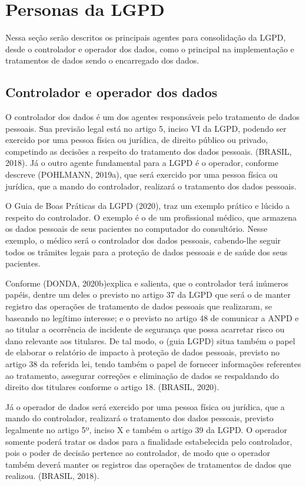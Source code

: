 \documentclass[
	12pt,				%
	openright,			%
	oneside,			%
	a4paper,			%
	english,			%
	french,				%
	spanish,			%
	brazil,				%
	]{abntex2}
\begin{document}
\section{Personas da LGPD}
\label{sec: exemplo2}

Nessa seção serão descritos os principais agentes para consolidação da LGPD, desde o controlador e operador dos dados, como o principal na implementação e tratamentos de dados sendo o encarregado dos dados.

\subsection{Controlador e operador dos dados}

O controlador dos dados é um dos agentes responsáveis pelo tratamento de dados pessoais. Sua previsão legal está no artigo 5, inciso VI da LGPD, podendo ser exercido por uma pessoa física ou jurídica, de direito público ou privado, competindo as decisões a respeito do tratamento dos dados pessoais. (BRASIL, 2018). Já o outro agente fundamental para a LGPD é o operador, conforme descreve (POHLMANN, 2019a), que será exercido por uma pessoa física ou jurídica, que a mando do controlador, realizará o tratamento dos dados pessoais.

O Guia de Boas Práticas da LGPD (2020), traz um exemplo prático e lúcido a respeito do controlador. O exemplo é o de um profissional médico, que armazena os dados pessoais de seus pacientes no computador do consultório. Nesse exemplo, o médico será o controlador dos dados pessoais, cabendo-lhe seguir todos os trâmites legais para a proteção de dados pessoais e de saúde dos seus pacientes.

Conforme (DONDA, 2020b)explica e salienta, que o controlador terá inúmeros papéis, dentre um deles o previsto no artigo 37 da LGPD que será o de manter registro das operações de tratamento de dados pessoais que realizaram, se baseando no legítimo interesse; e o previsto no artigo 48 de comunicar a ANPD e ao titular a ocorrência de incidente de segurança que possa acarretar risco ou dano relevante aos titulares. De tal modo, o (guia LGPD) situa também o papel de elaborar o relatório de impacto à proteção de dados pessoais, previsto no artigo 38 da referida lei, tendo também o papel de fornecer informações referentes ao tratamento, assegurar correções e eliminação de dados se respaldando do direito dos titulares conforme o artigo 18. (BRASIL, 2020).

Já o operador de dados será exercido por uma pessoa física ou jurídica, que a mando do controlador, realizará o tratamento dos dados pessoais, previsto legalmente no artigo 5º, inciso X e também o artigo 39 da LGPD. O operador somente poderá tratar os dados para a finalidade estabelecida pelo controlador, pois o poder de decisão pertence ao controlador, de modo que o operador também deverá manter os registros das operações de tratamentos de dados que realizou. (BRASIL, 2018).
\end{document}

